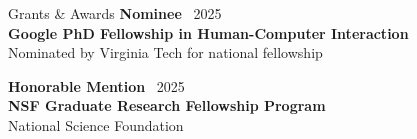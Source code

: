\documentclass{resume}
\begin{document}
\begin{rSection}{Grants \& Awards}
{\bf Nominee} \hfill {\ 2025}\\
\textbf{Google PhD Fellowship in Human-Computer Interaction}\\
Nominated by Virginia Tech for national fellowship


{\bf Honorable Mention} \hfill {\ 2025}\\
\textbf{NSF Graduate Research Fellowship Program}\\
National Science Foundation

\end{rSection}

\end{document}
